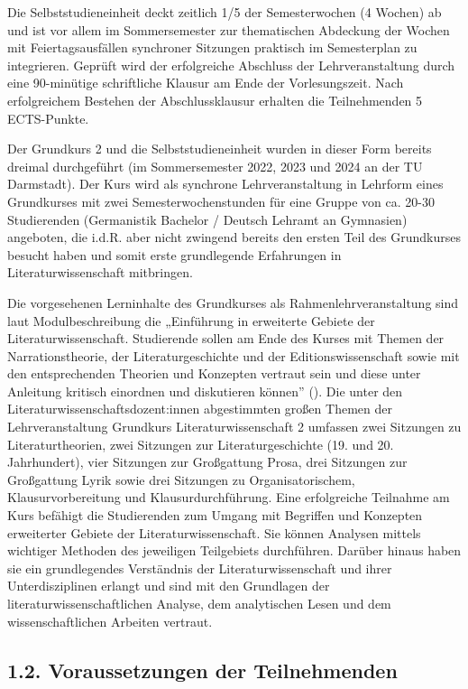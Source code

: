 \documentclass[
          a4paper,
        ]{article}
\begin{document}
Die Selbststudieneinheit deckt zeitlich 1/5 der Semesterwochen (4
Wochen) ab und ist vor allem im Sommersemester zur thematischen
Abdeckung der Wochen mit Feiertagsausfällen synchroner Sitzungen
praktisch im Semesterplan zu integrieren. Geprüft wird der erfolgreiche
Abschluss der Lehrveranstaltung durch eine 90-minütige schriftliche
Klausur am Ende der Vorlesungszeit. Nach erfolgreichem Bestehen der
Abschlussklausur erhalten die Teilnehmenden 5 ECTS-Punkte.

Der Grundkurs 2 und die Selbststudieneinheit wurden in dieser Form
bereits dreimal durchgeführt (im Sommersemester 2022, 2023 und 2024 an
der TU Darmstadt). Der Kurs wird als synchrone Lehrveranstaltung in
Lehrform eines Grundkurses mit zwei Semesterwochenstunden für eine
Gruppe von ca. 20-30 Studierenden (Germanistik Bachelor / Deutsch
Lehramt an Gymnasien) angeboten, die i.d.R. aber nicht zwingend bereits
den ersten Teil des Grundkurses besucht haben und somit erste
grundlegende Erfahrungen in Literaturwissenschaft mitbringen.

Die vorgesehenen Lerninhalte des Grundkurses als Rahmenlehrveranstaltung
sind laut Modulbeschreibung die „Einführung in erweiterte Gebiete der
Literaturwissenschaft. Studierende sollen am Ende des Kurses mit Themen
der Narrationstheorie, der Literaturgeschichte und der
Editionswissenschaft sowie mit den entsprechenden Theorien und Konzepten
vertraut sein und diese unter Anleitung kritisch einordnen und
diskutieren können'' (). Die unter den
Literaturwissenschaftsdozent:innen abgestimmten großen Themen der
Lehrveranstaltung Grundkurs Literaturwissenschaft 2 umfassen zwei
Sitzungen zu Literaturtheorien, zwei Sitzungen zur Literaturgeschichte
(19. und 20. Jahrhundert), vier Sitzungen zur Großgattung Prosa, drei
Sitzungen zur Großgattung Lyrik sowie drei Sitzungen zu
Organisatorischem, Klausurvorbereitung und Klausurdurchführung. Eine
erfolgreiche Teilnahme am Kurs befähigt die Studierenden zum Umgang mit
Begriffen und Konzepten erweiterter Gebiete der Literaturwissenschaft.
Sie können Analysen mittels wichtiger Methoden des jeweiligen
Teilgebiets durchführen. Darüber hinaus haben sie ein grundlegendes
Verständnis der Literaturwissenschaft und ihrer Unterdisziplinen erlangt
und sind mit den Grundlagen der literaturwissenschaftlichen Analyse, dem
analytischen Lesen und dem wissenschaftlichen Arbeiten vertraut.

\subsection{1.2. Voraussetzungen der
Teilnehmenden}\label{voraussetzungen-der-teilnehmenden}
\end{document}
